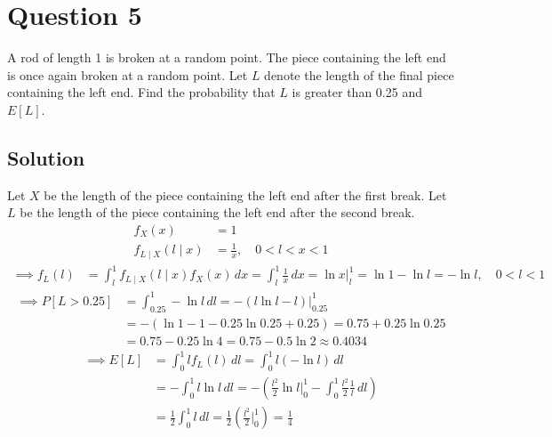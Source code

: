 \section*{Question 5}

A rod of length 1 is broken at a random point.
The piece containing the left end is once again broken at a random point.
Let \( L \) denote the length of the final piece containing the left end.
Find the probability that \( L \) is greater than 0.25 and \( E[L] \).

\subsection*{Solution}

Let \( X \) be the length of the piece containing the left end after the first break.
Let \( L \) be the length of the piece containing the left end after the second break.
\begin{align*}
    f_{X}(x)
     & =
    1
    \\
    f_{L \mid X}(l \mid x)
     & =
    \frac{1}{x},
    \quad
    0 < l < x < 1
\end{align*}
\begin{align*}
    \implies
    f_{L}(l)
     & =
    \int_{l}^{1} f_{L \mid X}(l \mid x) f_{X}(x) \, dx
    =
    \int_{l}^{1} \frac{1}{x} \, dx
    =
    \ln x \Big|_{l}^{1}
    =
    \ln 1 - \ln l
    =
    -\ln l,
    \quad
    0 < l < 1
\end{align*}
\begin{align*}
    \implies
    P[L > 0.25]
     & =
    \int_{0.25}^{1} -\ln l \, dl
    =
    - \left( l \ln l - l \right) \Big|_{0.25}^{1}
    \\ & =
    - \left( \ln 1 - 1 - 0.25 \ln 0.25 + 0.25 \right)
    =
    0.75 + 0.25 \ln 0.25
    \\ & =
    0.75 - 0.25 \ln 4
    =
    0.75 - 0.5 \ln 2
    \approx
    0.4034
\end{align*}
\begin{align*}
    \implies
    E[L]
     & =
    \int_{0}^{1} l f_{L}(l) \, dl
    =
    \int_{0}^{1} l (-\ln l) \, dl
    \\ & =
    - \int_{0}^{1} l \ln l \, dl
    =
    - \left( \frac{l^2}{2} \ln l \Big|_{0}^{1} - \int_{0}^{1} \frac{l^2}{2} \frac{1}{l} \, dl \right)
    \\ & =
    \frac{1}{2} \int_{0}^{1} l \, dl
    =
    \frac{1}{2} \left( \frac{l^2}{2} \Big|_{0}^{1} \right)
    =
    \frac{1}{4}
\end{align*}
